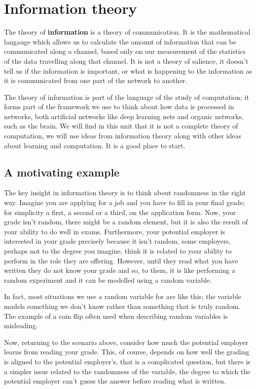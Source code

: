 \documentclass[12pt]{article}
\begin{document}
\section*{Information theory} 

The theory of \textbf{information} is a theory of communication. It is the
mathematical langauge which allows us to calculate the amount of
information that can be communicated along a channel, based only on
our measurement of the statistics of the data travelling along that
channel. It is not a theory of salience, it doesn't tell us if the
information is important, or what is happening to the information as
it is communicated from one part of the network to another.

The theory of information is part of the language of the study of
computation; it forms part of the framework we use to think about how
data is processed in networks, both artificial networks like deep
learning nets and organic networks, such as the brain. We will find in
this unit that it is not a complete theory of computation, we will use
ideas from information theory along with other ideas about learning
and computation. It is a good place to start.

\subsection*{A motivating example}

The key insight in information theory is to think about randomness in
the right way. Imagine you are applying for a job and you have to fill
in your final grade; for simplicity a first, a second or a third, on
the application form. Now, your grade isn't random, there might be a
random element, but it is also the result of your ability to do well
in exams. Furthermore, your potential employer is interested in your
grade precisely because it isn't random, some employers, perhaps not
to the degree you imagine, think it is related to your ability to perform
in the role they are offering. However, until they read what you have
written they do not know your grade and so, to them, it is like
performing a random experiment and it can be modelled using a random
variable.

In fact, most situations we use a random variable for are like this;
the variable models something we don't know rather than something that
is truly random. The example of a coin flip often used when describing
random variables is misleading.

Now, returning to the scenario above, consider how much the potential
employer learns from reading your grade. This, of course, depends on
how well the grading is aligned to the potential employer's, that is a
complicated question, but there is a simpler issue related to the
randomness of the variable, the degree to which the potential employer
can't guess the answer before reading what is written. 
\end{document}
